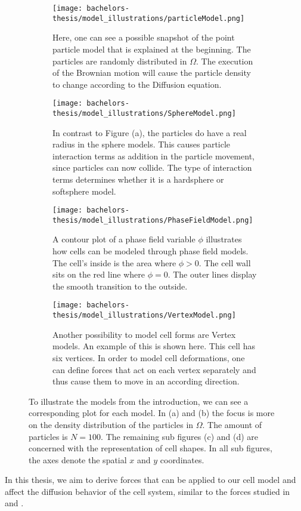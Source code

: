 \begin{figure}[t!]
	\centering
	\begin{subfigure}{0.4\textwidth}
		\texttt{[image: bachelors-thesis/model\_illustrations/particleModel.png]}
		\caption{Here, one can see a possible snapshot of the point particle model that is explained at the beginning. 
        The particles are randomly distributed in $\Omega$. 
        The execution of the Brownian motion will cause the particle density to change according to the Diffusion equation.}
	\end{subfigure}
	\hfill
	\begin{subfigure}{0.4\textwidth}
		\texttt{[image: bachelors-thesis/model\_illustrations/SphereModel.png]}
		\caption{In contrast to Figure (a), the particles do have a real radius in the sphere models. 
        This causes particle interaction terms as addition in the particle movement, since particles can now collide. 
        The type of interaction terms determines whether it is a hardsphere or softsphere model.   }
	\end{subfigure}
	\hfill
	\begin{subfigure}{0.4\textwidth}
		\texttt{[image: bachelors-thesis/model\_illustrations/PhaseFieldModel.png]}
		\caption{A contour plot of a phase field variable $\phi$ illustrates how cells can be modeled through phase field models. 
        The cell's inside is the area where $\phi > 0$. 
        The cell wall sits on the red line where $\phi = 0$. 
        The outer lines display the smooth transition to the outside. }
	\end{subfigure}\hfill
	\begin{subfigure}{0.4\textwidth}
		\texttt{[image: bachelors-thesis/model\_illustrations/VertexModel.png]}
		\caption{Another possibility to model cell forms are Vertex models. 
        An example of this is shown here. 
        This cell has six vertices. 
        In order to model cell deformations, one can define forces that act on each vertex separately and thus cause them to move in an according direction. }
	\end{subfigure}
	\caption{ To illustrate the models from the introduction, we can see a corresponding plot for each model. 
    In (a) and (b) the focus is more on the density distribution of the particles in $\Omega$. 
    The amount of particles is $N = 100$. The remaining sub figures (c) and (d) are concerned with the representation of cell shapes. 
    In all sub figures, the axes denote the spatial $x$ and $y$ coordinates. } 
	\label{fig:model_illus}
\end{figure}
In this thesis, we aim to derive forces that can be applied to our cell model and affect the diffusion behavior of the cell system, similar to the forces studied in \cite{Bruna2012} and \cite{Bruna2017}. \\


